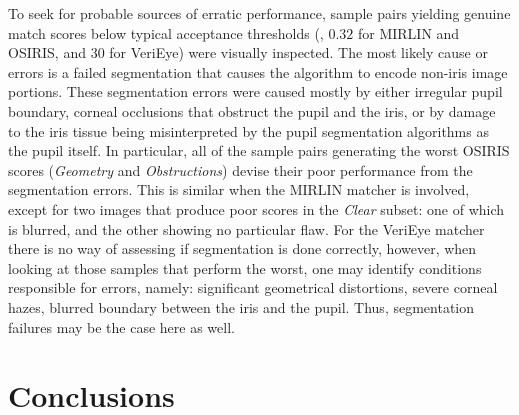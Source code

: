 \documentclass[10pt,twocolumn,letterpaper]{article}
\begin{document}
To seek for probable sources of erratic performance, sample pairs yielding genuine match scores below typical acceptance thresholds (\ie, $0.32$ for MIRLIN and OSIRIS, and $30$ for VeriEye) were visually inspected. The most likely cause or errors is a failed segmentation that causes the algorithm to encode non-iris image portions. These segmentation errors were caused mostly by either irregular pupil boundary, corneal occlusions that obstruct the pupil and the iris, or by damage to the iris tissue being misinterpreted by the pupil segmentation algorithms as the pupil itself.  In particular, all of the sample pairs generating the worst OSIRIS scores (\emph{Geometry} and \emph{Obstructions}) devise their poor performance from the segmentation errors. This is similar when the MIRLIN matcher is involved, except for two images that produce poor scores in the \emph{Clear} subset: one of which is blurred, and the other showing no particular flaw. For the VeriEye matcher there is no way of assessing if segmentation is done correctly, however, when looking at those samples that perform the worst, one may identify conditions responsible for errors, namely: significant geometrical distortions, severe corneal hazes, blurred boundary between the iris and the pupil. Thus, segmentation failures may be the case here as well.

\section{Conclusions}
\end{document}
